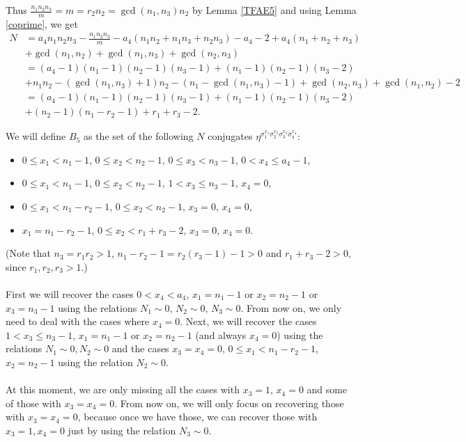 Thus $\frac{n_1n_2n_3}{m}=m=r_2n_2=\gcd(n_1,n_3)n_2$ by Lemma \ref{TFAE5} and using Lemma \ref{coprime}, we get
\begin{align*}
N&=a_4n_1n_2n_3-\frac{n_1n_2n_3}{m}-a_4(n_1n_2+n_1n_3+n_2n_3)-a_4-2+a_4(n_1+n_2+n_3)\\
&+\gcd(n_1,n_2)+\gcd(n_1,n_3)+\gcd(n_2,n_3)\\
&=(a_4-1)(n_1-1)(n_2-1)(n_3-1)+(n_1-1)(n_2-1)(n_3-2)\\
&+n_1n_2-(\gcd(n_1,n_3)+1)n_2-(n_1-\gcd(n_1,n_3)-1)+\gcd(n_2,n_3)+\gcd(n_1,n_2)-2\\
&=(a_4-1)(n_1-1)(n_2-1)(n_3-1)+(n_1-1)(n_2-1)(n_3-2)\\
&+(n_2-1)(n_1-r_2-1)+r_1+r_3-2.
\end{align*}

We will define $B_5$ as the set of the following $N$ conjugates $\eta^{\sigma_1^{x_1}\sigma_2^{x_2}\sigma_3^{x_3}\sigma_4^{x_4}}$:
\begin{itemize}
\item $0\leq x_1<n_1-1$, $ 0\leq x_2<n_2-1$, $ 0\leq x_3<n_3-1$, $ 0<x_4\leq a_4-1$,
\item $0\leq x_1<n_1-1$, $ 0\leq x_2<n_2-1$, $ 1< x_3 \leq n_3-1$, $ x_4=0$,
\item $0\leq x_1< n_1-r_2-1$, $ 0\leq x_2<n_2-1$, $ x_3=0$, $ x_4=0$,
\item           $x_1=n_1-r_2-1$, $ 0\leq x_2<r_1+r_3-2$, $ x_3=0$, $ x_4=0$.
\end{itemize}
(Note that $n_3=r_1r_2>1$, $n_1-r_2-1=r_2(r_3-1)-1> 0$ and $r_1+r_3-2>0$, since $r_1,r_2,r_3>1$.)

\paragraph*{}
First we will recover the cases $0<x_4<a_4$, $x_1=n_1-1$ or $x_2=n_2-1$ or $x_3=n_3-1$ using the relations $N_1\sim 0$, $N_2\sim 0$, $N_3\sim 0$. From now on, we only need to deal with the cases where $x_4=0$. Next, we will recover the cases $1< x_3 \leq n_3-1$, $x_1=n_1-1$ or $x_2=n_2-1$ (and always $x_4=0$) using the relations $N_1\sim 0, N_2\sim 0$ and the cases $x_3=x_4=0$, $0\leq x_1< n_1-r_2-1$, $x_2=n_2-1$ using the relation $N_2\sim 0$.
\paragraph*{}
At this moment, we are only missing all the cases with $x_3=1$, $x_4=0$ and some of those with $x_3=x_4=0$. From now on, we will only focus on recovering those with $x_3=x_4=0$, because once we have those, we can recover those with $x_3=1,x_4=0$ just by using the relation $N_3\sim 0$.
